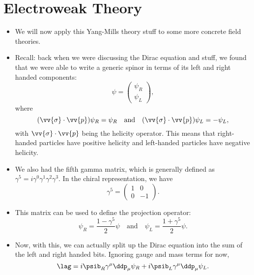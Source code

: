 \section{Electroweak Theory}

\begin{itemize}
    \item We will now apply this Yang-Mills theory stuff to some more concrete field theories. 
    \item Recall: back when we were discussing the Dirac equation and stuff, we found that we were able to write a generic spinor in terms of its left and right handed components:
        \begin{equation}
            \psi = \begin{pmatrix}\psi_R \\ \psi_L\end{pmatrix},
        \end{equation}
        where 
        \begin{equation}
            (\vv{\sigma}\cdot\vv{p})\psi_R = \psi_R \quad\mathrm{and}\quad (\vv{\sigma}\cdot\vv{p})\psi_L = -\psi_L,
        \end{equation}
        with $\vv{\sigma}\cdot\vv{p}$ being the helicity operator. This means that right-handed particles have positive helicity and left-handed particles have negative helicity.
    \item We also had the fifth gamma matrix, which is generally defined as $\gamma^5 = i\gamma^0\gamma^1\gamma^2\gamma^3$. In the chiral representation, we have
        \begin{equation}
            \gamma^5 = \begin{pmatrix}1 & 0 \\ 0 & -1\end{pmatrix}.
        \end{equation}
    \item This matrix can be used to define the projection operator:
        \begin{equation}
            \psi_R = \frac{1-\gamma^5}{2}\psi \quad\mathrm{and}\quad \psi_L = \frac{1+\gamma^5}{2}\psi.
        \end{equation}
    \item Now, with this, we can actually split up the Dirac equation into the sum of the left and right handed bits. Ignoring gauge and mass terms for now, 
        \begin{equation}
            \lag = i\psib_R \gamma^{\mu} \ddp_{\mu} \psi_R + i\psib_L \gamma^{\mu} \ddp_{\mu} \psi_L.

\end{equation}
\end{itemize}
